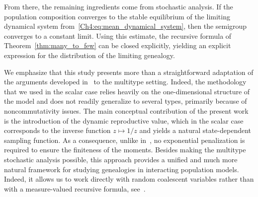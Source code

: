\begin{refsegment}
From there, the remaining ingredients come from stochastic analysis. If the population composition converges to the stable equilibrium of the limiting dynamical system from~\eqref{Ch4:eq:mean_dynamical_system}, then the semigroup converges to a constant limit.  
Using this estimate, the recursive formula of Theorem~\ref{thm:many_to_few} can be closed explicitly, yielding an explicit expression for the distribution of the limiting genealogy.

We emphasize that this study presents more than a straightforward adaptation of the arguments developed in~\cite{AFRS_2025} to the multitype setting. Indeed, the methodology that we used in the scalar case relies heavily on the one-dimensional structure of the model and does not readily generalize to several types, primarily because of noncommutativity issues. 
The main conceptual contribution of the present work is the introduction of the dynamic reproductive value, which in the scalar case corresponds to the inverse function $z\mapsto 1/z$ and yields a natural state-dependent sampling function.
 As a consequence, unlike in~\cite{AFRS_2025}, no exponential penalization is required to ensure the finiteness of the moments. Besides making the multitype stochastic analysis possible, this approach provides a unified and much more natural framework for studying genealogies in interacting population models. Indeed, it allows us to work directly with random coalescent variables rather than with a measure-valued recursive formula, see~\citet[Theorem~2.3]{AFRS_2025}.


\end{refsegment}
